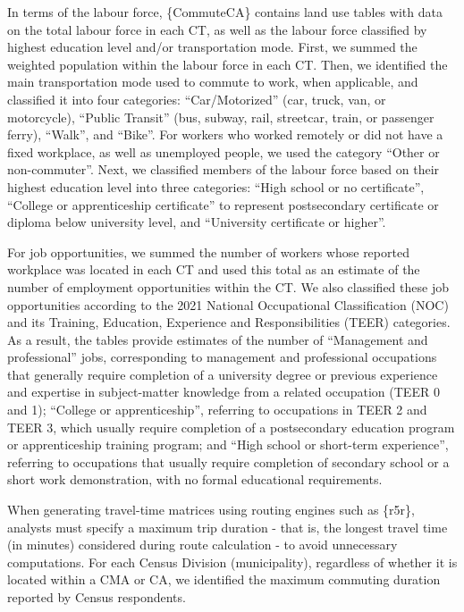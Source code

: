 \documentclass[sn-basic,lineno,pdflatex]{sn-jnl}
\begin{document}
In terms of the labour force, \{CommuteCA\} contains land use tables
with data on the total labour force in each CT, as well as the labour
force classified by highest education level and/or transportation mode.
First, we summed the weighted population within the labour force in each
CT. Then, we identified the main transportation mode used to commute to
work, when applicable, and classified it into four categories:
``Car/Motorized'' (car, truck, van, or motorcycle), ``Public Transit''
(bus, subway, rail, streetcar, train, or passenger ferry), ``Walk'', and
``Bike''. For workers who worked remotely or did not have a fixed
workplace, as well as unemployed people, we used the category ``Other or
non-commuter''. Next, we classified members of the labour force based on
their highest education level into three categories: ``High school or no
certificate'', ``College or apprenticeship certificate'' to represent
postsecondary certificate or diploma below university level, and
``University certificate or higher''.

For job opportunities, we summed the number of workers whose reported
workplace was located in each CT and used this total as an estimate of
the number of employment opportunities within the CT. We also classified
these job opportunities according to the 2021 National Occupational
Classification (NOC) and its Training, Education, Experience and
Responsibilities (TEER) categories. As a result, the tables provide
estimates of the number of ``Management and professional'' jobs,
corresponding to management and professional occupations that generally
require completion of a university degree or previous experience and
expertise in subject-matter knowledge from a related occupation (TEER 0
and 1); ``College or apprenticeship'', referring to occupations in TEER
2 and TEER 3, which usually require completion of a postsecondary
education program or apprenticeship training program; and ``High school
or short-term experience'', referring to occupations that usually
require completion of secondary school or a short work demonstration,
with no formal educational requirements.

When generating travel-time matrices using routing engines such as
\{r5r\}, analysts must specify a maximum trip duration - that is, the
longest travel time (in minutes) considered during route calculation -
to avoid unnecessary computations. For each Census Division
(municipality), regardless of whether it is located within a CMA or CA,
we identified the maximum commuting duration reported by Census
respondents.
\end{document}
